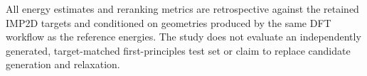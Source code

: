 All energy estimates and reranking metrics are retrospective against the
retained IMP2D targets and conditioned on geometries produced by the same DFT
workflow as the reference energies.  The study does not evaluate an
independently generated, target-matched first-principles test set or claim to
replace candidate generation and relaxation.
